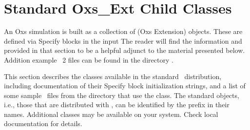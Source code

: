 
\section{Standard Oxs\_Ext Child Classes}\label{sec:oxsext}%
An Oxs simulation is built as a collection of  (Oxs
Extension) objects.  These are defined via Specify blocks in the input
The reader will find the information and
 provided in that section to be a helpful
adjunct to the material presented below.  Addition example \MIF~2
files can be found in the directory .

This section describes the  classes available in the
standard \OOMMF\ distribution, including documentation of their Specify
block initialization strings, and a list of some sample \MIF\ files from
the  directory that use the class.  The
standard  objects, i.e., those that are distributed with
\OOMMF, can be identified by the  prefix in their names.
Additional  classes may be available on your system.  Check
local documentation for details.

